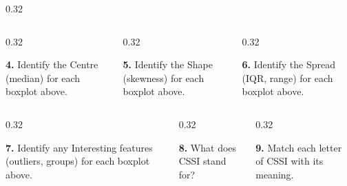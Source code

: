 \documentclass[aspectratio=169,12pt]{beamer}
\newcommand{\MMProblem}[2]{\begin{MMProblemCard}\raggedright\small\textbf{#1.} #2\par\end{MMProblemCard}}
\begin{document}
\begin{frame}[t]
\begin{columns}[T,onlytextwidth]
\begin{column}{0.32\textwidth}
{}\end{column}
\end{columns}
\vspace{0.45em}
\begin{columns}[T,onlytextwidth]
\begin{column}{0.32\textwidth}\MMProblem{4}{Identify the Centre (median) for each boxplot above.}\end{column}
\begin{column}{0.32\textwidth}\MMProblem{5}{Identify the Shape (skewness) for each boxplot above.}\end{column}
\begin{column}{0.32\textwidth}\MMProblem{6}{Identify the Spread (IQR, range) for each boxplot above.}\end{column}
\end{columns}
\vspace{0.45em}
\begin{columns}[T,onlytextwidth]
\begin{column}{0.32\textwidth}\MMProblem{7}{Identify any Interesting features (outliers, groups) for each boxplot above.}\end{column}
\begin{column}{0.32\textwidth}\MMProblem{8}{What does CSSI stand for?}\end{column}
\begin{column}{0.32\textwidth}\MMProblem{9}{Match each letter of CSSI with its meaning.}\end{column}
\end{columns}
\end{frame}
\end{document}
